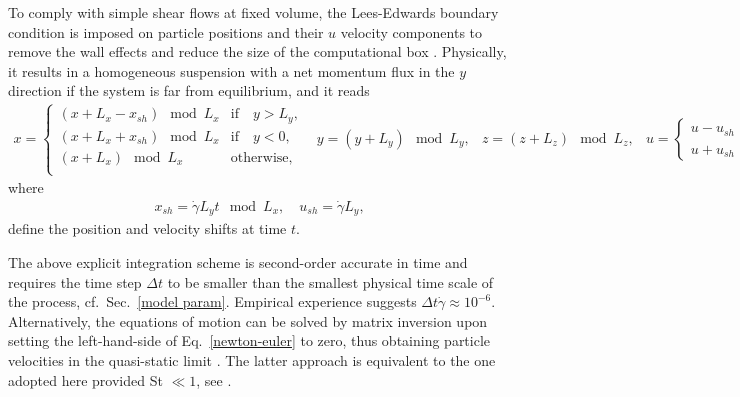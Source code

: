 To comply with simple shear flows at fixed volume, the Lees-Edwards boundary condition is imposed on particle positions and their $u$ velocity components to remove the wall effects and reduce the size of the computational box \citep{Lees_Edwards_1972}. Physically, it results in a homogeneous suspension with a net momentum flux in the $y$ direction if the system is far from equilibrium, and it reads
\begin{subequations}
  \begin{equation} 
    \begin{aligned}
      x=
      \begin{cases}
        (x+L_x-x_{sh}) \mod L_x & \textrm{if} \quad  y>L_y, \\
        (x+L_x+x_{sh}) \mod L_x & \textrm{if} \quad  y<0, \\
        (x+L_x) \mod L_x & \textrm{otherwise}, \\
      \end{cases}
    \end{aligned}
  \end{equation}
  \begin{equation} 
    \begin{aligned}
      y=(y+L_y) \mod L_y,
    \end{aligned}
  \end{equation}
  \begin{equation} 
    \begin{aligned}
      z=(z+L_z) \mod L_z,
    \end{aligned}
  \end{equation}
  \begin{equation} 
    \begin{aligned}
      u=
      \begin{cases}
        u-u_{sh}  & \textrm{if} \quad  y>L_y, \\
        u+u_{sh}  & \textrm{if} \quad  y<0, 
      \end{cases}
    \end{aligned}
  \end{equation}
\end{subequations}
where
\begin{equation} 
  \begin{aligned}
    x_{sh} = \dot{\gamma}L_yt \mod L_x, \quad u_{sh} = \dot{\gamma}L_y,
  \end{aligned}
\end{equation}
define the position and velocity shifts at time $t$.

The above explicit integration scheme is second-order accurate in time and requires the time step $\Delta t$ to be smaller than the smallest physical time scale of the process, cf.\ Sec.\ \ref{model param}. Empirical experience suggests $\Delta t \dot{\gamma} \approx 10^{-6}$. Alternatively, the equations of motion can be solved by matrix inversion upon setting the left-hand-side of Eq.\ \eqref{newton-euler} to zero, thus obtaining particle velocities in the quasi-static limit \citep{Mari_Seto_2014JoR}. The latter approach is equivalent to the one adopted here provided St $\ll 1$, see \eg \cite{Ness_Mari_Cates_2018}.

